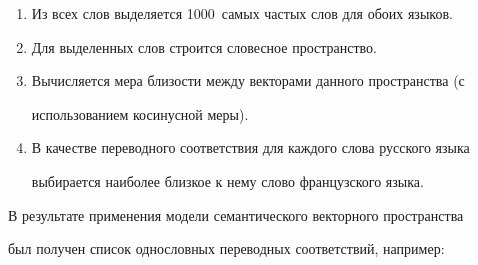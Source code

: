   \begin{enumerate}[1.]


\item Из всех слов выделяется 1000~самых частых слов для обоих языков.


\item Для выделенных слов строится словесное пространство.


\item Вычисляется мера близости между векторами данного пространства (с


использованием косинусной меры).


\item В качестве переводного соответствия для каждого слова русского языка


выбирается наиболее близкое к нему слово французского языка.


  \end{enumerate}





  В результате применения модели семантического векторного пространства


был получен список однословных переводных соответствий, например:\linebreak\vspace*{-12pt}





\pagebreak





 \noindent


